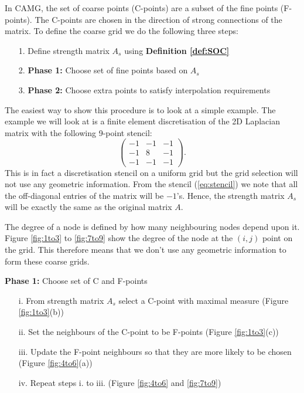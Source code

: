 \documentclass[11pt]{article}
\numberwithin{equation}{section}    %
\begin{document}
In CAMG, the set of coarse points (C-points) are a subset of the fine points (F-points). The C-points are chosen in the direction of strong connections of the matrix. To define the coarse grid we do the following three steps:
\begin{itemize}
  \item[1.] Define strength matrix $A_s$ using \textbf{Definition  \ref{def:SOC}}
  \item[2.] \textbf{Phase 1:} Choose set of fine points based on $A_s$
  \item[3.] \textbf{Phase 2:} Choose extra points to satisfy interpolation requirements
\end{itemize}
The easiest way to show this procedure is to look at a simple example. The example we will look at is a finite element discretisation of the 2D Laplacian matrix with the following 9-point stencil:
\begin{equation} \label{eq:stencil}
 \begin{pmatrix}
     -1 &-1&-1\\
     -1 &8&-1\\
     -1 &-1&-1
   \end{pmatrix}.
\end{equation}
This is in fact a discretisation stencil on a uniform grid but the grid selection will not use any geometric information. From the stencil (\ref{eq:stencil}) we note that all the off-diagonal entries of the matrix will be $-1$'s. Hence, the strength matrix $A_s$ will be exactly the same as the original matrix $A$.

The degree of a node is defined by how many neighbouring nodes depend upon it. Figure \ref{fig:1to3} to \ref{fig:7to9} show the degree of the node at the $(i,j)$ point on the grid. This therefore means that we don't use any geometric information to form these coarse grids.

\textbf{Phase 1:} Choose set of C and F-points
\begin{itemize}
    \item[i. ] From strength matrix $A_s$ select a C-point with maximal measure (Figure \ref{fig:1to3}(b))
    \item[ii. ] Set the neighbours of the C-point to be F-points (Figure \ref{fig:1to3}(c))
    \item[iii. ] Update the F-point neighbours so that they are more likely to be chosen  (Figure \ref{fig:4to6}(a))
    \item[iv. ] Repeat steps i. to iii. (Figure \ref{fig:4to6} and \ref{fig:7to9})
\end{itemize}
\end{document}
